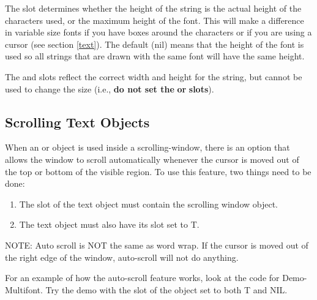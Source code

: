 \label{actualheightp}
The slot  determines whether the height of the string
is the actual height of the characters used, or the maximum height of the
font.  This will make a difference in variable size fonts if you have boxes
around the characters or if you are using a cursor (see section
\ref{text}).  The
default ({\sc nil}) means that the height of the font is used so all strings
that are drawn with the same font will have the same height.

The  and  slots reflect the correct width and height
for the string, but cannot be used to change the size (i.e., {\bf do not
set the}  {\bf or}  {\bf slots}).



\subsection{Scrolling Text Objects}
\label{auto-scroll}

When an  or  object is used inside a
scrolling-window, there is an option that allows the window to scroll
automatically whenever the cursor is moved out of the top or bottom of
the visible region.  To use this feature, two things need to be done:

\begin{enumerate}
\item The  slot of the text object must contain the scrolling
window object.

\item The text object must also have its  slot set to T.
\end{enumerate}

NOTE: Auto scroll is NOT the same as word wrap.  If the cursor is
moved out of the right edge of the window, auto-scroll will not do
anything.

For an example of how the auto-scroll feature works, look at the code
for Demo-Multifont.  Try the demo with the
 slot of the object  set to
both T and NIL.

